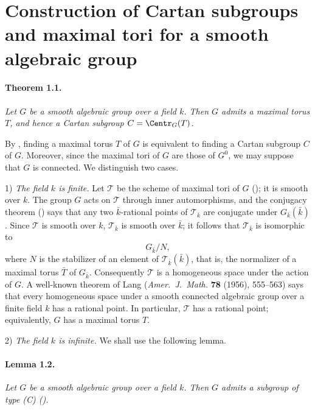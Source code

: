


\section{Construction of Cartan subgroups and maximal tori for a
smooth algebraic group}

\paragraph{\textbf{Theorem 1.1.}}
\emph{Let \(G\) be a smooth algebraic group over a field \(k\).
Then \(G\) admits a maximal torus \(T\), and hence a Cartan subgroup
\(C=\Centr_G(T)\).}

By , finding a maximal torus \(T\) of \(G\) is equivalent to
finding a Cartan subgroup \(C\) of \(G\). Moreover, since the maximal
tori of \(G\) are those of \(G^0\), we may suppose that \(G\) is
connected. We distinguish two cases.

\medskip
\noindent\textup{1\textdegree)} \emph{The field \(k\) is finite.}
Let \(\mathcal T\) be the scheme of maximal tori of \(G\)
(); it is smooth over \(k\). The group \(G\) acts on
\(\mathcal T\) through inner automorphisms, and the conjugacy theorem
() says that any two \(\bar k\)-rational points of
\(\mathcal T_{\bar k}\) are conjugate under
\(G_{\bar k}(\bar k)\). Since \(\mathcal T\) is smooth over \(k\),
\(\mathcal T_{\bar k}\) is smooth over \(\bar k\); it follows that
\(\mathcal T_{\bar k}\) is isomorphic to
\[
  G_{\bar k}/N,
\]
where \(N\) is the stabilizer of an element of
\(\mathcal T_{\bar k}(\bar k)\), that is, the normalizer of a
maximal torus \(\bar T\) of \(G_{\bar k}\). Consequently
\(\mathcal T\) is a homogeneous space under the action of \(G\).
A well-known theorem of Lang
(\emph{Amer.\ J.\ Math.} \textbf{78} (1956), 555--563) says that
every homogeneous space under a smooth connected algebraic group
over a finite field \(k\) has a rational point. In particular,
\(\mathcal T\) has a rational point; equivalently, \(G\) has a
maximal torus \(T\).

\medskip
\noindent\textup{2\textdegree)} \emph{The field \(k\) is infinite.}
We shall use the following lemma.

\paragraph{\textbf{Lemma 1.2.}}
\emph{Let \(G\) be a smooth algebraic group over a field \(k\).
Then \(G\) admits a subgroup of type \textup{(C)}
\textup{()}.}

